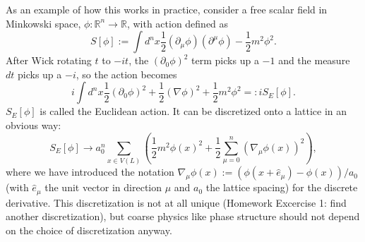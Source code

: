 \documentclass[9pt,twocolumn,twoside]{article}
\begin{document}
As an example of how this works in practice, consider a free scalar field in Minkowski space, $\phi:\mathbb{R}^n\rightarrow \mathbb{R}$, with action defined as 
\[S[\phi] := \int d^nx \frac{1}{2}(\partial_{\mu}\phi) (\partial^{\mu}\phi) - \frac{1}{2}m^2\phi^2.\]
After Wick rotating $t$ to $-it$, the $(\partial_0\phi)^2$ term picks up a $-1$ and the measure $dt$ picks up a $-i$, so the action becomes
\[i \int d^nx \frac{1}{2}(\partial_0\phi)^2 + \frac{1}{2}(\nabla\phi)^2 + \frac{1}{2}m^2\phi^2 =: i S_E[\phi].\]
$S_E[\phi]$ is called the Euclidean action.  It can be discretized onto a lattice in an obvious way:
\[ S_E[\phi] \rightarrow a_0^n \sum_{x\in V(L)} \left( \frac{1}{2}m^2\phi(x)^2 + \frac{1}{2} \sum_{\mu=0}^n (\nabla_{\mu} \phi(x))^2 \right),\]
where we have introduced the notation $\nabla_{\mu} \phi(x) := (\phi(x+\hat{e}_{\mu}) - \phi(x))/a_0$ (with $\hat{e}_{\mu}$ the unit vector in direction $\mu$ and $a_0$ the lattice spacing) for the discrete derivative.  This discretization is not at all unique (Homework Excercise 1: find another discretization), but coarse physics like phase structure should not depend on the choice of discretization anyway.  
\end{document}
